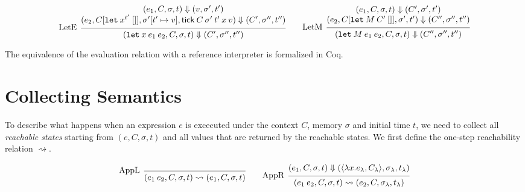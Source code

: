 \documentclass{article}
\theoremstyle{definition}
\newcommand*{\tick}{\mathsf{tick}}
\begin{document}
\[
  \begin{prooftree}
    \hypo{
      \begin{matrix}
        (e_{1}, C, \sigma, t)
        \Downarrow
        (v, \sigma', t') \\
        (e_{2}, C[\mathtt{let}\:x^{t'}\:[]], \sigma'[t'\mapsto v], \tick\:C\:\sigma'\:t'\:x\:v)
        \Downarrow
        (C', \sigma'', t'')
      \end{matrix}
    }
    \infer[left label=LetE]1{
    (\mathtt{let}\:x\:e_1\:e_2, C, \sigma, t)
    \Downarrow
    (C', \sigma'', t'')
    }
  \end{prooftree}\qquad
  \begin{prooftree}
    \hypo{
      \begin{matrix}
        (e_{1}, C, \sigma, t)
        \Downarrow
        (C', \sigma', t') \\
        (e_{2}, C[\mathtt{let}\:M\:C'\:[]], \sigma', t')
        \Downarrow
        (C'', \sigma'', t'')
      \end{matrix}
    }
    \infer[left label=LetM]1{
    (\mathtt{let}\:M\:e_{1}\:e_{2}, C, \sigma, t)
    \Downarrow
    (C'', \sigma'', t'')
    }
  \end{prooftree}
\]

The equivalence of the evaluation relation with a reference interpreter is formalized in Coq.

\section{Collecting Semantics}

To describe what happens when an expression $e$ is excecuted under the context $C$, memory $\sigma$ and initial time $t$, we need to collect all \emph{reachable states} starting from $(e,C,\sigma,t)$ and all values that are returned by the reachable states.
We first define the one-step reachability relation $\rightsquigarrow$.

\[
  \begin{prooftree}
    \infer[left label={AppL}]0{
    (e_{1}\:e_{2}, C, \sigma, t)
    \rightsquigarrow
    (e_{1},C, \sigma,t)
    }
  \end{prooftree}\qquad
  \begin{prooftree}
    \hypo{
      \begin{matrix}
        (e_{1}, C, \sigma, t)
        \Downarrow
        (\langle\lambda x.e_{\lambda}, C_{\lambda}\rangle, \sigma_{\lambda}, t_{\lambda})
      \end{matrix}
    }
    \infer[left label={AppR}]1{
    (e_{1}\:e_{2}, C, \sigma, t)
    \rightsquigarrow
    (e_{2}, C, \sigma_{\lambda}, t_{\lambda})
    }
  \end{prooftree}
\]
\end{document}
